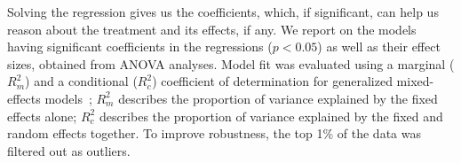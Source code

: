 Solving the regression gives us the coefficients, which, if significant, can help 
us reason about the treatment and its effects, if any.
We report on the models having significant coefficients in the regressions 
($p < 0.05$) as well as their effect sizes, obtained from ANOVA analyses.
Model fit was evaluated using a marginal ($R^2_m$) and a conditional ($R^2_c$) 
coefficient of determination for generalized mixed-effects 
models~\cite{nakagawa2013general, johnson2014extension}; $R^2_m$ describes 
the proportion of variance explained by the fixed effects alone; $R^2_c$ describes 
the proportion of variance explained by the fixed and random effects together.
To improve robustness, the top 1\% of the data was filtered out as outliers.




